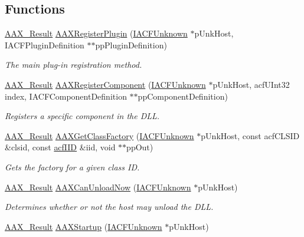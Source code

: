\subsection*{Functions}
\begin{DoxyCompactItemize}
\item 
\hyperlink{a00149_a4d8f69a697df7f70c3a8e9b8ee130d2f}{A\+A\+X\+\_\+\+Result} \hyperlink{a00326_ga83d05333118598c179ca6d89487fa203}{A\+A\+X\+Register\+Plugin} (\hyperlink{a00146}{I\+A\+C\+F\+Unknown} $\ast$p\+Unk\+Host, I\+A\+C\+F\+Plugin\+Definition $\ast$$\ast$pp\+Plugin\+Definition)
\begin{DoxyCompactList}\small\item\em The main plug-\/in registration method. \end{DoxyCompactList}\item 
\hyperlink{a00149_a4d8f69a697df7f70c3a8e9b8ee130d2f}{A\+A\+X\+\_\+\+Result} \hyperlink{a00253_a03c71f96fcf624bf50b7acbe31a846f0}{A\+A\+X\+Register\+Component} (\hyperlink{a00146}{I\+A\+C\+F\+Unknown} $\ast$p\+Unk\+Host, acf\+U\+Int32 index, I\+A\+C\+F\+Component\+Definition $\ast$$\ast$pp\+Component\+Definition)
\begin{DoxyCompactList}\small\item\em Registers a specific component in the D\+L\+L. \end{DoxyCompactList}\item 
\hyperlink{a00149_a4d8f69a697df7f70c3a8e9b8ee130d2f}{A\+A\+X\+\_\+\+Result} \hyperlink{a00253_a84cf37211a57dbaec9e7d077dd171798}{A\+A\+X\+Get\+Class\+Factory} (\hyperlink{a00146}{I\+A\+C\+F\+Unknown} $\ast$p\+Unk\+Host, const acf\+C\+L\+S\+I\+D \&clsid, const \hyperlink{a00150_a59df0b41744eee7a066787aaedf97f67}{acf\+I\+I\+D} \&iid, void $\ast$$\ast$pp\+Out)
\begin{DoxyCompactList}\small\item\em Gets the factory for a given class I\+D. \end{DoxyCompactList}\item 
\hyperlink{a00149_a4d8f69a697df7f70c3a8e9b8ee130d2f}{A\+A\+X\+\_\+\+Result} \hyperlink{a00253_a160de7bc2883da8ba24400933d814523}{A\+A\+X\+Can\+Unload\+Now} (\hyperlink{a00146}{I\+A\+C\+F\+Unknown} $\ast$p\+Unk\+Host)
\begin{DoxyCompactList}\small\item\em Determines whether or not the host may unload the D\+L\+L. \end{DoxyCompactList}\item 
\hyperlink{a00149_a4d8f69a697df7f70c3a8e9b8ee130d2f}{A\+A\+X\+\_\+\+Result} \hyperlink{a00253_a0d9b6aed98567dfb34a38b69432b564d}{A\+A\+X\+Startup} (\hyperlink{a00146}{I\+A\+C\+F\+Unknown} $\ast$p\+Unk\+Host)
$$
\end{DoxyCompactItemize}
